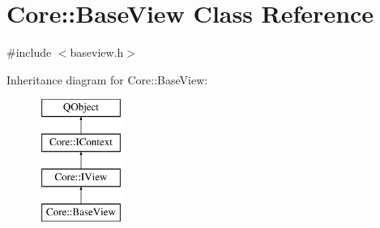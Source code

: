 \hypertarget{class_core_1_1_base_view}{\section{Core\-:\-:Base\-View Class Reference}
\label{class_core_1_1_base_view}
}


{\ttfamily \#include $<$baseview.\-h$>$}

Inheritance diagram for Core\-:\-:Base\-View\-:\begin{figure}[H]
\begin{center}
\leavevmode
\includegraphics[height=4.000000cm]{class_core_1_1_base_view}
\end{center}
\end{figure}
